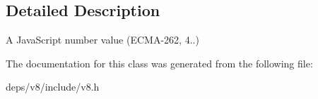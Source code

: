 \subsection{Detailed Description}
A Java\+Script number value (E\+C\+M\+A-\/262, 4..) 

The documentation for this class was generated from the following file\+:\begin{DoxyCompactItemize}
\item 
deps/v8/include/v8.\+h\end{DoxyCompactItemize}
